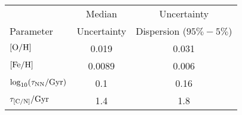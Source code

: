 \begin{tabular}{l|cc}
\hline\hline
 & Median & Uncertainty  \\
Parameter & Uncertainty & Dispersion ($95\% - 5\%$) \\
\hline
${\rm [O/H]}$ & 0.019 & 0.031 \\
${\rm [Fe/H]}$ & 0.0089 & 0.006 \\
$\log_{10}(\tau_{\rm NN}/{\rm Gyr})$ & 0.1 & 0.16 \\
$\tau_{\rm [C/N]}/{\rm Gyr}$ & 1.4 & 1.8 \\
\hline
\end{tabular}
